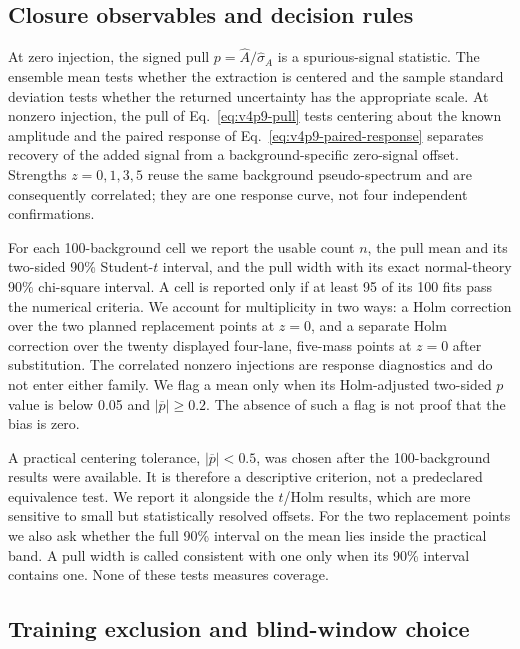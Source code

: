 \subsection{Closure observables and decision rules}

At zero injection, the signed pull
$p=\widehat A/\widehat\sigma_A$ is a spurious-signal statistic.  The ensemble mean
tests whether the extraction is centered and the sample standard deviation tests
whether the returned uncertainty has the appropriate scale.  At nonzero injection,
the pull of Eq.~\eqref{eq:v4p9-pull} tests centering about the known amplitude and the
paired response of Eq.~\eqref{eq:v4p9-paired-response} separates recovery of the
added signal from a background-specific zero-signal offset.  Strengths
$z=0,1,3,5$ reuse the same background pseudo-spectrum and are consequently
correlated; they are one response curve, not four independent confirmations.

For each 100-background cell we report the usable count $n$, the pull mean and its
two-sided 90\% Student-$t$ interval, and the pull width with its exact normal-theory
90\% chi-square interval.  A cell is reported only if at least 95 of its 100 fits pass
the numerical criteria.  We account for multiplicity in two ways: a Holm correction
over the two planned replacement points at $z=0$, and a separate Holm correction over
the twenty displayed four-lane, five-mass points at $z=0$ after substitution.  The
correlated nonzero injections are response diagnostics and do not enter either family.
We flag a mean only when its Holm-adjusted two-sided $p$ value is below 0.05 and
$|\overline p|\geq0.2$.  The absence of such a flag is not proof that the bias is zero.

A practical centering tolerance, $|\overline p|<0.5$, was chosen after the
100-background results were available.  It is therefore a descriptive criterion, not
a predeclared equivalence test.  We report it alongside the $t$/Holm results, which are
more sensitive to small but statistically resolved offsets.  For the two replacement
points we also ask whether the full 90\% interval on the mean lies inside the practical
band.  A pull width is called consistent with one only when its 90\% interval contains
one.  None of these tests measures \CLs{} coverage.

\subsection{Training exclusion and blind-window choice}
\label{subsec:v491-guard-band-construction}

